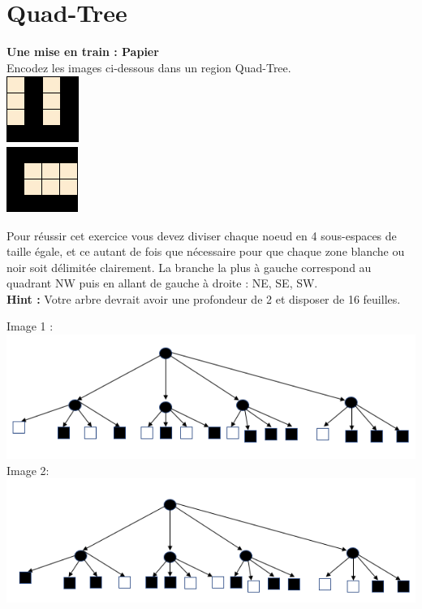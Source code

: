 \newpage

\section{ Quad-Tree}
\begin{Exercice}[10 minutes]\textbf{Une mise en train : Papier}\\

Encodez les images ci-dessous dans un region Quad-Tree.\\

\includegraphics[]{Quad-Tree 1.PNG}\\
\includegraphics[]{Quad-Tree 2.PNG}

\begin{conseil}
   Pour réussir cet exercice vous devez diviser chaque noeud en 4 sous-espaces de taille égale, et ce autant de fois que nécessaire pour que chaque zone blanche ou noir soit délimitée clairement. La branche la plus à gauche correspond au quadrant NW puis en allant de gauche à droite : NE, SE, SW. \\
    
    \textbf{Hint :} Votre arbre devrait avoir une profondeur de 2 et disposer de 16 feuilles.
\end{conseil}
\begin{solution}
Image 1 :\\
    \includegraphics[]{Quad-Tree 1 solution.PNG}\\
    
Image 2: \\
    \includegraphics[]{Quad-Tree 2 solution.PNG}
\end{solution}
\end{Exercice}
